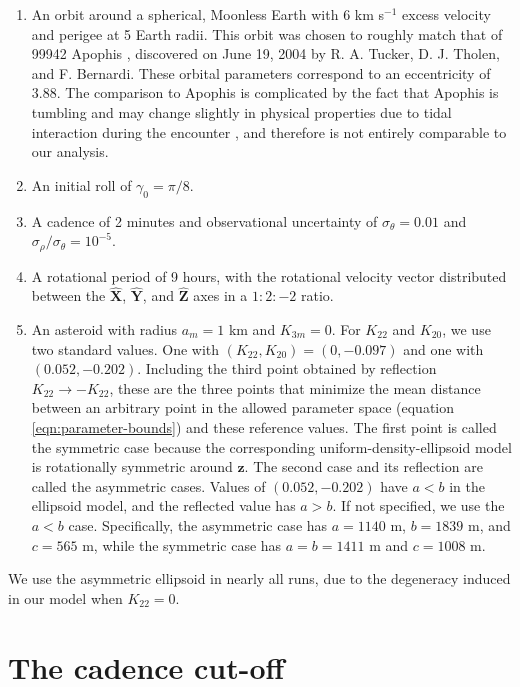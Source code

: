 \documentclass[fleqn,usenatbib]{mnras}
\newcommand{\unit}[1]{\bm{\hat{#1}}}
\begin{document}
\begin{enumerate}
  \item An orbit around a spherical, Moonless Earth with $6$ km s$^{-1}$ excess velocity and perigee at 5 Earth radii. This orbit was chosen to roughly match that of 99942 Apophis \cite{giorgini2005recent, giorgini2008predicting, smalley20052004}, discovered on June 19, 2004 by R. A. Tucker, D. J. Tholen, and F. Bernardi. These orbital parameters correspond to an eccentricity of 3.88. The comparison to Apophis is complicated by the fact that Apophis is tumbling \cite{PRAVEC201448} and may change slightly in physical properties due to tidal interaction during the encounter \cite{yu2014numerical,hirabayashi2021finite}, and therefore is not entirely comparable to our analysis. 
  \item An initial roll of $\gamma_0=\pi/8$.
  \item A cadence of 2 minutes and observational uncertainty of $\sigma_\theta = 0.01$ and $\sigma_\rho / \sigma_\theta = 10^{-5}$.
  \item A rotational period of 9 hours, with the rotational velocity vector distributed between the $\unit X$, $\unit Y$, and $\unit Z$ axes in a $1:2:-2$ ratio.
  \item An asteroid with radius $a_m = 1$ km and $K_{3m}=0$. For $K_{22}$ and $K_{20}$, we use two standard values. One with $(K_{22}, K_{20}) = (0, -0.097)$ and one with $(0.052, -0.202)$. Including the third point obtained by reflection $K_{22}\rightarrow -K_{22}$, these are the three points that minimize the mean distance between an arbitrary point in the allowed parameter space (equation \ref{eqn:parameter-bounds}) and these reference values. The first point is called the symmetric case because the corresponding uniform-density-ellipsoid model is rotationally symmetric around $\unit z$. The second case and its reflection are called the asymmetric cases. Values of $(0.052, -0.202)$ have $a < b$ in the ellipsoid model, and the reflected value has $a > b$. If not specified, we use the $a < b$ case. Specifically, the asymmetric case has $a=1140$ m, $b=1839$ m, and $c=565$ m, while the symmetric case has $a=b=1411$ m and $c=1008$ m.
\end{enumerate}

We use the asymmetric ellipsoid in nearly all runs, due to the degeneracy induced in our model when $K_{22} = 0$.


\section{The cadence cut-off}
\label{app:cadence-tests}
\end{document}
